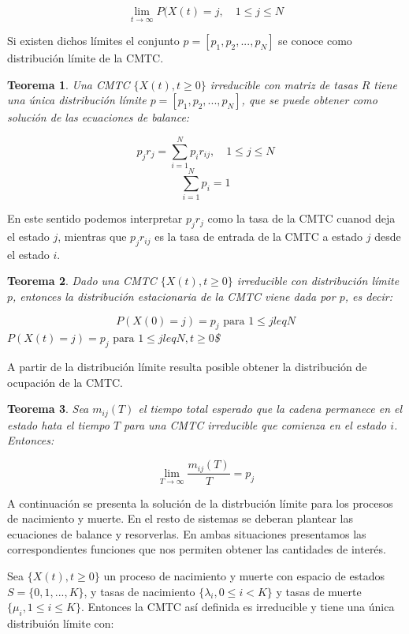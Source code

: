 \documentclass[
]{book}
\newtheorem{theorem}{Teorema}[chapter]
\theoremstyle{definition}
\theoremstyle{definition}
\theoremstyle{definition}
\theoremstyle{definition}
\theoremstyle{remark}
\begin{document}
\[\lim_{t \rightarrow \infty} P(X(t) = j, \quad 1 \leq j \leq N\]

Si existen dichos límites el conjunto \(p = [p_1, p_2,...,p_N]\) se conoce como distribución límite de la CMTC.

\begin{theorem}
Una CMTC \(\{X(t), t \geq 0\}\) irreducible con matriz de tasas \(R\) tiene una única distribución límite \(p = [p_1, p_2,...,p_N]\), que se puede obtener como solución de las ecuaciones de balance:

\[p_j r_j = \sum_{i=1}^N p_ir_{ij}, \quad 1 \leq j \leq N\] \[\sum_{i=1}^N p_i = 1\]
\end{theorem}

En este sentido podemos interpretar \(p_jr_j\) como la tasa de la CMTC cuanod deja el estado \(j\), mientras que \(p_jr_{ij}\) es la tasa de entrada de la CMTC a estado \(j\) desde el estado \(i\).

\begin{theorem}
Dado una CMTC \(\{X(t), t \geq 0\}\) irreducible con distribución límite \(p\), entonces la distribución estacionaria de la CMTC viene dada por \(p\), es decir:

\[P(X(0) = j) = p_j \text{ para } 1 \leq j leq N\] \(P(X(t) = j) = p_j \text{ para } 1 \leq j leq N, t \geq 0\)\$
\end{theorem}

A partir de la distribución límite resulta posible obtener la distribución de ocupación de la CMTC.

\begin{theorem}
Sea \(m_{ij}(T)\) el tiempo total esperado que la cadena permanece en el estado hata el tiempo \(T\) para una CMTC irreducible que comienza en el estado \(i\). Entonces:

\[\lim_{T \rightarrow \infty} \frac{m_{ij}(T)}{T} = p_j\]
\end{theorem}

A continuación se presenta la solución de la distrbución límite para los procesos de nacimiento y muerte. En el resto de sistemas se deberan plantear las ecuaciones de balance y resorverlas. En ambas situaciones presentamos las correspondientes funciones que nos permiten obtener las cantidades de interés.

Sea \(\{X(t), t \geq 0\}\) un proceso de nacimiento y muerte con espacio de estados \(S = \{0, 1,...,K\}\), y tasas de nacimiento \(\{\lambda_i, 0 \leq i < K\}\) y tasas de muerte \(\{\mu_i, 1 \leq i \leq K\}\). Entonces la CMTC así definida es irreducible y tiene una única distribuión límite con:
\end{document}
